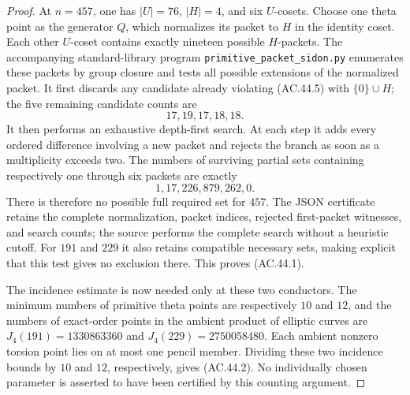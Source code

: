 \begin{proof}
At \(n=457\), one has \(|U|=76\), \(|H|=4\), and six
\(U\)-cosets. Choose one theta point as the generator \(Q\),
which normalizes its packet to \(H\) in the identity coset.
Each other \(U\)-coset contains exactly nineteen possible
\(H\)-packets. The accompanying standard-library program
\texttt{primitive\_packet\_sidon.py} enumerates these packets by
group closure and tests all possible extensions of the normalized
packet. It first discards any candidate already violating
(AC.44.5) with \(\{0\}\cup H\); the five remaining candidate
counts are
\[
                            17,19,17,18,18.
\]
It then performs an exhaustive depth-first search. At each step
it adds every ordered difference involving a new packet and
rejects the branch as soon as a multiplicity exceeds two.
The numbers of surviving partial sets containing respectively
one through six packets are exactly
\[
                         1,17,226,879,262,0.
\tag{AC.44.6}
\]
There is therefore no possible full required set for \(457\).
The JSON certificate retains the complete normalization, packet
indices, rejected first-packet witnesses, and search counts;
the source performs the complete search without a heuristic cutoff.
For \(191\) and \(229\) it also retains compatible necessary
sets, making explicit that this test gives no exclusion there.
This proves (AC.44.1).

The incidence estimate is now needed only at these two conductors.
The minimum numbers of primitive theta points are respectively
\(10\) and \(12\), and the numbers of exact-order points in
the ambient product of elliptic curves are
\(J_4(191)=1330863360\) and \(J_4(229)=2750058480\).
Each ambient nonzero torsion point lies on at most one pencil
member. Dividing these two incidence bounds by \(10\) and
\(12\), respectively, gives (AC.44.2). No individually chosen
parameter is asserted to have been certified by this counting
argument.
\end{proof}
